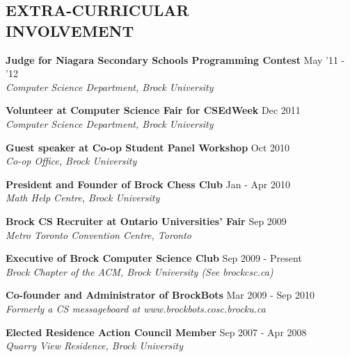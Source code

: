 \documentclass[margin]{res}
\begin{document}
\begin{resume}

\section{EXTRA-CURRICULAR \\ INVOLVEMENT}

  \textbf{Judge for Niagara Secondary Schools Programming Contest} \hfill May '11 - '12 \\
    {\sl Computer Science Department, Brock University}

  \textbf{Volunteer at Computer Science Fair for CSEdWeek} \hfill Dec 2011 \\
    {\sl Computer Science Department, Brock University}

  \textbf{Guest speaker at Co-op Student Panel Workshop} \hfill Oct 2010 \\
    {\sl Co-op Office, Brock University}

  \textbf{President and Founder of Brock Chess Club} \hfill Jan - Apr 2010 \\
    {\sl Math Help Centre, Brock University}

  \textbf{Brock CS Recruiter at Ontario Universities' Fair} \hfill Sep 2009 \\
    {\sl Metro Toronto Convention Centre, Toronto}

  \textbf{Executive of Brock Computer Science Club} \hfill Sep 2009 - Present \\
    {\sl Brock Chapter of the ACM, Brock University (See brockcsc.ca)}


  \textbf{Co-founder and Administrator of BrockBots} \hfill Mar 2009 - Sep 2010 \\
    {\sl Formerly a CS messageboard at www.brockbots.cosc.brocku.ca}
    

  \textbf{Elected Residence Action Council Member} \hfill Sep 2007 - Apr 2008 \\
    {\sl Quarry View Residence, Brock University}
 

\end{resume}
\end{document}
